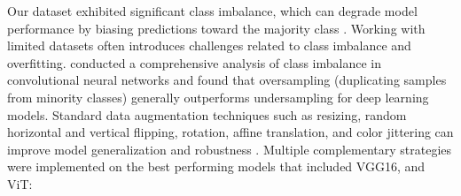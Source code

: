 \documentclass[a4paper,12pt]{report}
\begin{document}
Our dataset exhibited significant class imbalance, which can degrade model performance by biasing predictions toward the majority class \citep{krawczyk2016learning}. Working with limited datasets often introduces challenges related to class imbalance and overfitting. \citep{buda2018systematic} conducted a comprehensive analysis of class imbalance in convolutional neural networks and found that oversampling (duplicating samples from minority classes) generally outperforms undersampling for deep learning models. Standard data augmentation techniques such as resizing, random horizontal and vertical flipping, rotation, affine translation, and color jittering can improve model generalization and robustness \citep{yang2022augmentation,wu2024augmentation}. Multiple complementary strategies were implemented on the best performing models that included VGG16, and ViT:

\end{document}
